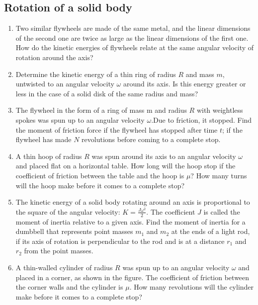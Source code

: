\documentclass{article}
\begin{document}
\subsection{Rotation of a solid body}

\begin{enumerate}[label=2.7.\arabic*]

\item Two similar flywheels are made of the same metal, and the linear dimensions of the second one are twice as large as the linear dimensions of the first one. How do the kinetic energies of flywheels relate at the same angular velocity of rotation around the axis?

\item Determine the kinetic energy of a thin ring of radius $R$ and mass $m$, untwisted to an angular velocity $\omega$ around its axis. Is this energy greater or less in the case of a solid disk of the same radius and mass?

\item The flywheel in the form of a ring of mass m and radius $R$ with weightless spokes was spun up to an angular velocity $\omega$.Due to friction, it stopped. Find the moment of friction force if the flywheel has stopped after time $t$; if the flywheel has made $N$ revolutions before coming to a complete stop.

\item A thin hoop of radius $R$ was spun around its axis to an angular velocity $\omega$ and placed flat on a horizontal table. How long will the hoop stop if the coefficient of friction between the table and the hoop is $\mu$? How many turns will the hoop make before it comes to a complete stop?

\item The kinetic energy of a solid body rotating around an axis is proportional to the square of the angular velocity: $K = \frac{J \omega^2}{2}$. The coefficient $J$ is called the moment of inertia relative to a given axis. Find the moment of inertia for a dumbbell that represents point masses $m_1$ and $m_2$ at the ends of a light rod, if its axis of rotation is perpendicular to the rod and is at a distance $r_1$ and $r_2$ from the point masses.

\item A thin-walled cylinder of radius $R$ was spun up to an angular velocity $\omega$ and placed in a corner, as shown in the figure. The coefficient of friction between the corner walls and the cylinder is $\mu$. How many revolutions will the cylinder make before it comes to a complete stop?


\end{enumerate}
\end{document}
